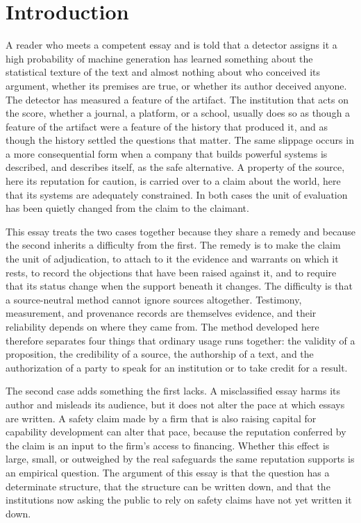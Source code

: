 \documentclass[12pt]{article}
\theoremstyle{definition}
\theoremstyle{remark}
\begin{document}
\clearpage
\setcounter{page}{1}

\section{Introduction}

A reader who meets a competent essay and is told that a detector assigns it a high probability of machine generation has learned something about the statistical texture of the text and almost nothing about who conceived its argument, whether its premises are true, or whether its author deceived anyone. The detector has measured a feature of the artifact. The institution that acts on the score, whether a journal, a platform, or a school, usually does so as though a feature of the artifact were a feature of the history that produced it, and as though the history settled the questions that matter. The same slippage occurs in a more consequential form when a company that builds powerful systems is described, and describes itself, as the safe alternative. A property of the source, here its reputation for caution, is carried over to a claim about the world, here that its systems are adequately constrained. In both cases the unit of evaluation has been quietly changed from the claim to the claimant.

This essay treats the two cases together because they share a remedy and because the second inherits a difficulty from the first. The remedy is to make the claim the unit of adjudication, to attach to it the evidence and warrants on which it rests, to record the objections that have been raised against it, and to require that its status change when the support beneath it changes. The difficulty is that a source-neutral method cannot ignore sources altogether. Testimony, measurement, and provenance records are themselves evidence, and their reliability depends on where they came from. The method developed here therefore separates four things that ordinary usage runs together: the validity of a proposition, the credibility of a source, the authorship of a text, and the authorization of a party to speak for an institution or to take credit for a result.

The second case adds something the first lacks. A misclassified essay harms its author and misleads its audience, but it does not alter the pace at which essays are written. A safety claim made by a firm that is also raising capital for capability development can alter that pace, because the reputation conferred by the claim is an input to the firm's access to financing. Whether this effect is large, small, or outweighed by the real safeguards the same reputation supports is an empirical question. The argument of this essay is that the question has a determinate structure, that the structure can be written down, and that the institutions now asking the public to rely on safety claims have not yet written it down.
\end{document}
